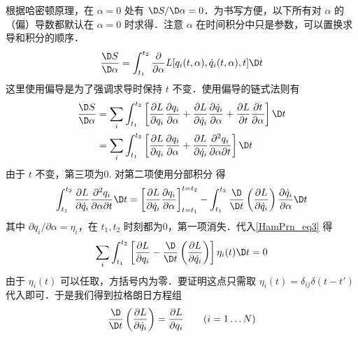 根据哈密顿原理，在 $\alpha = 0$ 处有 $\D S/\D\alpha  = 0$．为书写方便，以下所有对 $\alpha$ 的（偏）导数都默认在 $\alpha=0$ 时求得．注意 $\alpha$ 在时间积分中只是参数，可以置换求导和积分的顺序．
\begin{equation}
\frac{{\D S}}{{\D\alpha }} = \int_{{t_1}}^{{t_2}} {\frac{\partial }{{\partial \alpha }}L[{q_i}(t,\alpha ),{{\dot q}_i}(t,\alpha ),t]\D t}
\end{equation}
这里使用偏导是为了强调求导时保持 $t$ 不变．使用偏导的链式法则有
\begin{equation}\label{HamPrn_eq3}
\begin{aligned}
\frac{{\D S}}{{\D\alpha }} &= \sum\limits_i {\int_{{t_1}}^{{t_2}} {\left[ {\frac{{\partial L}}{{\partial {q_i}}}\frac{{\partial {q_i}}}{{\partial \alpha }} + \frac{{\partial L}}{{\partial {{\dot q}_i}}}\frac{{\partial {{\dot q}_i}}}{{\partial \alpha }} + \frac{{\partial L}}{{\partial t}}\frac{{\partial t}}{{\partial \alpha }}} \right]\D t} } \\
&= \sum\limits_i {\int_{{t_1}}^{{t_2}} {\left[ {\frac{{\partial L}}{{\partial {q_i}}}\frac{{\partial {q_i}}}{{\partial \alpha }} + \frac{{\partial L}}{{\partial {{\dot q}_i}}}\frac{{{\partial ^2}{q_i}}}{{\partial \alpha \partial t}}} \right]\D t} } 
\end{aligned}\end{equation}
由于 $t$ 不变，第三项为0. 对第二项使用分部积分 得
\begin{equation}
\int_{{t_1}}^{{t_2}} {\frac{{\partial L}}{{\partial {{\dot q}_i}}}\frac{{{\partial ^2}{q_i}}}{{\partial \alpha \partial t}}\D t}  = \left[ {\frac{{\partial L}}{{\partial {{\dot q}_i}}}\frac{{\partial {q_i}}}{{\partial \alpha }}} \right]_{t = {t_1}}^{t = {t_2}} - \int_{{t_1}}^{{t_2}} {\frac{\D}{{\D t}}\left( {\frac{{\partial L}}{{\partial {{\dot q}_i}}}} \right)\frac{{\partial {{\dot q}_i}}}{{\partial \alpha }}\D t} 
\end{equation}
其中 $\partial {q_i}/\partial \alpha  = {\eta _i}$，在 $t_1,t_2$ 时刻都为0，第一项消失．代入\autoref{HamPrn_eq3} 得
\begin{equation}
\sum\limits_i {\int_{{t_1}}^{{t_2}} {\left[ {\frac{{\partial L}}{{\partial {q_i}}} - \frac{\D}{{\D t}}\left( {\frac{{\partial L}}{{\partial {{\dot q}_i}}}} \right)} \right]{\eta _i}(t)\D t} }  = 0
\end{equation}
由于 ${\eta _i}(t)$ 可以任取，方括号内为零．要证明这点只需取 ${\eta _i}(t) = {\delta _{ij}}\delta (t - t')$ 代入即可．于是我们得到拉格朗日方程组
\begin{equation}
\frac{\D}{{\D t}}\left( {\frac{{\partial L}}{{\partial {{\dot q}_i}}}} \right) = \frac{{\partial L}}{{\partial {q_i}}}
\qquad
(i = 1\dots N)
\end{equation}